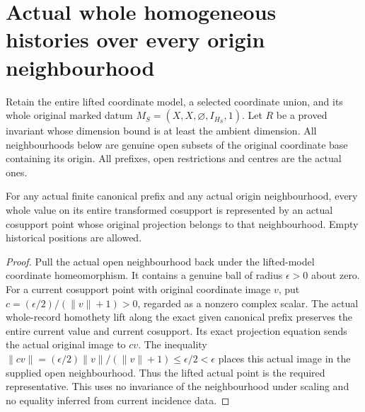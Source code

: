 \section{Actual whole homogeneous histories over every origin neighbourhood}
\label{sec:hironaka-homogeneous-canonical-neighbourhoods}

Retain the entire lifted coordinate model, a selected coordinate union,
and its whole original marked datum $M_S=(X,X,\varnothing,I_{H_S},1)$.
Let $R$ be a proved invariant whose dimension bound is at least the
ambient dimension. All neighbourhoods below are genuine open subsets
of the original coordinate base containing its origin. All prefixes,
open restrictions and centres are the actual ones.

\begin{theorem}
\label{hir:homogeneous-every-whole-value-over-origin-neighbourhood}
For any actual finite canonical prefix and any actual origin
neighbourhood, every whole value on its entire transformed cosupport
is represented by an actual cosupport point whose original projection
belongs to that neighbourhood. Empty historical positions are allowed.
\leanok
{}
\end{theorem}
\begin{proof}
Pull the actual open neighbourhood back under the lifted-model
coordinate homeomorphism. It contains a genuine ball of radius
$\epsilon>0$ about zero. For a current cosupport point with original
coordinate image $v$, put
$c=(\epsilon/2)/(\lVert v\rVert+1)>0$, regarded as a nonzero complex
scalar. The actual whole-record homothety lift along the exact given
canonical prefix preserves the entire current value and current
cosupport. Its exact projection equation sends the actual original
image to $cv$. The inequality
$\lVert cv\rVert=(\epsilon/2)\lVert v\rVert/(\lVert v\rVert+1)
\leq\epsilon/2<\epsilon$ places this actual image in the supplied open
neighbourhood. Thus the lifted actual point is the required
representative. This uses no invariance of the neighbourhood under
scaling and no equality inferred from current incidence data.
\end{proof}

